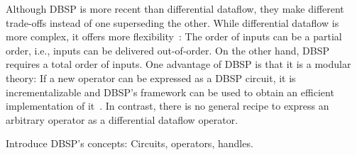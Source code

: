 Although DBSP is more recent than differential dataflow,
they make different trade-offs instead of one superseding the other.
While differential dataflow is more complex, it offers more
flexibility~\cite{budiu2025dbsp}:
The order of inputs can be a partial order, i.e., inputs can be delivered
out-of-order.
On the other hand, DBSP requires a total order of inputs.
One advantage of DBSP is that it is a modular theory:
If a new operator can be expressed as a DBSP circuit, it is incrementalizable
and DBSP's framework can be used to obtain an efficient implementation
of it~\cite{budiu2025dbsp}.
In contrast, there is no general recipe to express an arbitrary operator
as a differential dataflow operator.

Introduce DBSP's concepts: Circuits, operators, handles.
